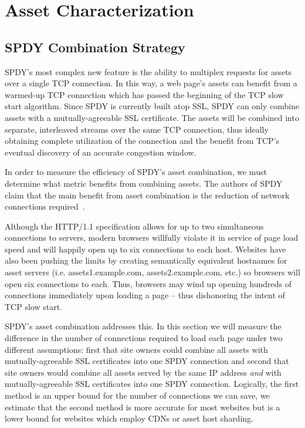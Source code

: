 \documentclass[10pt,letterpaper,notitlepage]{article}
\begin{document}
\section{Asset Characterization}
\label{sec:assets}
\subsection{SPDY Combination Strategy}
SPDY's most complex new feature is the ability to multiplex requests for assets
over a single TCP connection. In this way, a web page's assets can benefit from
a warmed-up TCP connection which has passed the beginning of the TCP slow start
algorithm. Since SPDY is currently built atop SSL, SPDY can only combine assets
with a mutually-agreeable SSL certificate. The assets will be combined into
separate, interleaved streams over the same TCP connection, thus ideally
obtaining complete utilization of the connection and the benefit from TCP's
eventual discovery of an accurate congestion window.

In order to measure the efficiency of SPDY's asset combination, we must
determine what metric benefits from combining assets. The authors of SPDY claim
that the main benefit from asset combination is the reduction of network
connections required~\cite{spdy-whitepaper}.

Although the HTTP/1.1 specification allows for up to two simultaneous
connections to servers, modern browsers willfully violate it in service of page
load speed and will happily open up to six connections to each host. Websites
have also been pushing the limits by creating semantically equivalent hostnames
for asset servers (i.e. assets1.example.com, assets2.example.com, etc.) so
browsers will open six connections to each. Thus, browsers may wind up opening
hundreds of connections immediately upon loading a page -- thus dishonoring the
intent of TCP slow start.

SPDY's asset combination addresses this. In this section we will measure the
difference in the number of connections required to load each page under two
different assumptions: first that site owners could combine all assets with
mutually-agreeable SSL certificates into one SPDY connection and second that
site owners would combine all assets served by the same IP address \textit{and}
with mutually-agreeable SSL certificates into one SPDY connection. Logically,
the first method is an upper bound for the number of connections we can save,
we estimate that the second method is more accurate for most websites but is a
lower bound for websites which employ CDNs or asset host sharding.
\end{document}
